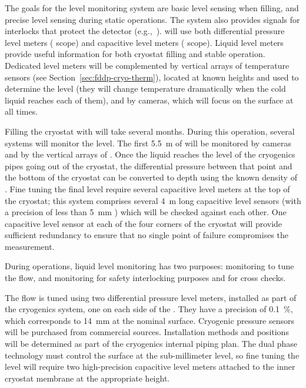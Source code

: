 The goals for the  level monitoring system are basic level sensing when filling, and precise level sensing during static operations.  The system also provides signals for  interlocks that protect the detector (e.g.,\ ).  will use both differential pressure level meters ( scope) and capacitive level meters ( scope). Liquid level meters provide useful information for both cryostat filling and stable operation. Dedicated level meters will be complemented by vertical arrays of temperature sensors (see Section~\ref{sec:fddp-cryo-therm}), located at known heights and used to determine the \lar level (they will change temperature dramatically when the cold liquid reaches each of them), and by cameras, which will focus on the \lar surface at all times.  

Filling the cryostat with \lar will take several months. During this operation, several systems will monitor the \lar level. 
The first \SI{5.5}{m} of  will be monitored by cameras and by the vertical arrays of . Once the liquid reaches the level of the cryogenics pipes going out of the cryostat, 
the differential pressure between that point and the bottom of the cryostat
can be converted to depth using
the known density of \lar.  Fine tuning the final  level require several capacitive level meters at the top of the cryostat; this system comprises several \SI{4}{m}  long capacitive level sensors (with a precision of less than \SI{5}{mm} ) which will be checked against each other. One capacitive level sensor at each of the four corners of the cryostat will provide sufficient redundancy to ensure that no single point of failure compromises the %
measurement.


During operations, liquid level monitoring has two purposes:
monitoring to tune the \lar flow, and monitoring for safety interlocking purposes and for cross checks. 


The \lar flow is tuned using two differential pressure level meters, installed as part of the cryogenics system, one on each side of the .  They have a precision of \SI{0.1}{\%}, which corresponds to \SI{14}{mm} at the nominal  surface. Cryogenic pressure sensors will be purchased from commercial sources. Installation methods and positions will be determined as part of the cryogenics internal piping plan. 
The dual phase technology must control the  surface at the sub-millimeter level, so fine tuning the  level will require two high-precision capacitive level meters attached to the inner cryostat membrane at the appropriate height.   


